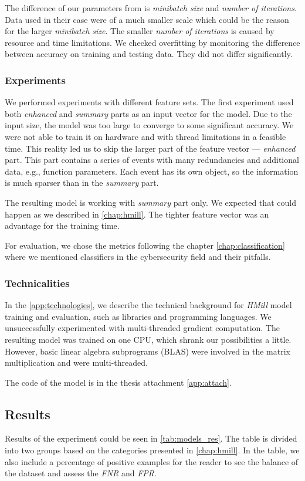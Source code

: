 The difference of our parameters from \cite{Mandlik2020} is \emph{minibatch size} and \emph{number of iterations}. Data used in their case were of a much smaller scale which could be the reason for the larger \emph{minibatch size}. The smaller \emph{number of iterations} is caused by resource and time limitations. We checked overfitting by monitoring the difference between accuracy on training and testing data. They did not differ significantly.

\subsubsection{Experiments}
We performed experiments with different feature sets. The first experiment used both \emph{enhanced} and \emph{summary} parts as an input vector for the model. Due to the input size, the model was too large to converge to some significant accuracy. We were not able to train it on hardware and with thread limitations in a feasible time. This reality led us to skip the larger part of the feature vector --- \emph{enhanced} part. This part contains a series of events with many redundancies and additional data, e.g., function parameters. Each event has its own object, so the information is much sparser than in the \emph{summary} part.

The resulting model is working with \emph{summary} part only.  We expected that could happen as we described in \ref{chap:hmill}. The tighter feature vector was an advantage for the training time.

For evaluation, we chose the metrics following the chapter \ref{chap:classification} where we mentioned classifiers in the cybersecurity field and their pitfalls.

\subsubsection{Technicalities}
In the \ref{app:technologies}, we describe the technical background for \emph{HMill} model training and evaluation, such as libraries and programming languages. We unsuccessfully experimented with multi-threaded gradient computation. The resulting model was trained on one CPU, which shrank our possibilities a little. However, basic linear algebra subprograms (BLAS) were involved in the matrix multiplication and were multi-threaded.

The code of the model is in the thesis attachment \ref{app:attach}.

\subsection{Results}
Results of the experiment could be seen in \ref{tab:models_res}. The table is divided into two groups based on the categories presented in \ref{chap:hmill}. In the table, we also include a percentage of positive examples for the reader to see the balance of the dataset and assess the \emph{FNR} and \emph{FPR}.

